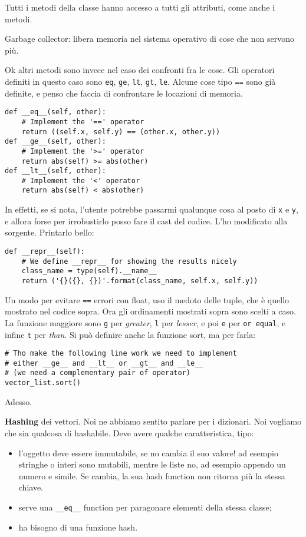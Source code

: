 \documentclass[10pt, a4paper, titlepage]{book}
\begin{document}
Tutti i metodi della classe hanno accesso a tutti gli attributi, come anche i metodi.

Garbage collector: libera memoria nel sistema operativo di cose che non servono più.

Ok altri metodi sono invece nel caso dei confronti fra le cose.
Gli operatori definiti in questo caso sono \texttt{eq}, \texttt{ge}, \texttt{lt}, \texttt{gt}, \texttt{le}. Alcune cose tipo \texttt{==} sono già definite, e penso che faccia di confrontare le locazioni di memoria.
\begin{verbatim}
def __eq__(self, other):
	# Implement the '==' operator
	return ((self.x, self.y) == (other.x, other.y))
def __ge__(self, other):
	# Implement the '>=' operator
	return abs(self) >= abs(other)
def __lt__(self, other):
	# Implement the '<' operator
	return abs(self) < abs(other)
\end{verbatim}

In effetti, se si nota, l'utente potrebbe passarmi qualunque cosa al posto di \texttt{x} e \texttt{y}, e allora forse per irrobustirlo posso fare il cast del codice. L'ho modificato alla sorgente.
Printarlo bello:
\begin{verbatim}
def __repr__(self):
	# We define __repr__ for showing the results nicely
	class_name = type(self).__name__
	return ('{}({}, {})'.format(class_name, self.x, self.y))	
\end{verbatim}

Un modo per evitare \texttt{==} errori con float, uso il medoto delle tuple, che è quello mostrato nel codice sopra.
Ora gli ordinamenti mostrati sopra sono scelti a caso.
La funzione maggiore sono \texttt{g} per \textit{greater}, \texttt{l} per \textit{lesser}, e poi \texttt{e} per \texttt{or equal}, e infine \texttt{t} per \textit{than}.
Si può definire anche la funzione sort, ma per farla:
\begin{verbatim}
# Tho make the following line work we need to implement
# either __ge__ and __lt__ or __gt__ and __le__ 
# (we need a complementary pair of operator)
vector_list.sort()
\end{verbatim}

Adesso.

\textbf{Hashing} dei vettori. Noi ne abbiamo sentito parlare per i dizionari. Noi vogliamo che sia qualcosa di hashabile.
Deve avere qualche caratteristica, tipo:
\begin{itemize}
	\item l'oggetto deve essere immutabile, se no cambia il suo valore! ad esempio stringhe o interi sono mutabili, mentre le liste no, ad esempio appendo un numero e simile. Se cambia, la sua hash function non ritorna più la stessa chiave.
	\item serve una \texttt{__eq__} function per paragonare elementi della stessa classe;
	\item ha bisogno di una funzione hash.
\end{itemize}
\end{document}
